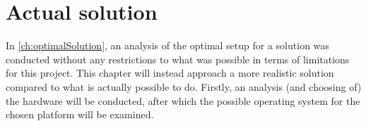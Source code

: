 \chapter{Actual solution}
In \autoref{ch:optimalSolution}, an analysis of the optimal setup for a solution was conducted without any restrictions to what was possible in terms of limitations for this project.
This chapter will instead approach a more realistic solution compared to what is actually possible to do.
Firstly, an analysis (and choosing of) the hardware will be conducted, after which the possible operating system for the chosen platform will be examined.

